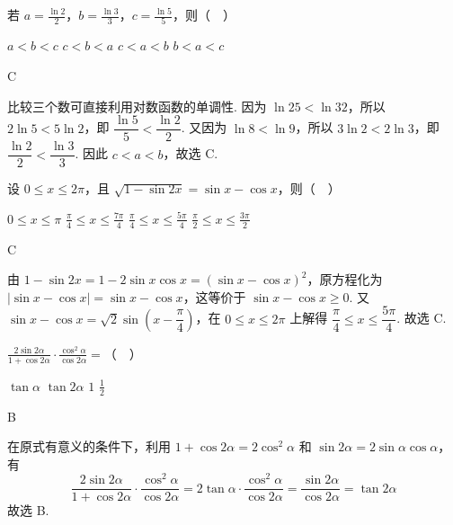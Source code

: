 \begin{problem}
若 \(a = \frac{\ln 2}{2}\)，\(b = \frac{\ln 3}{3}\)，\(c = \frac{\ln 5}{5}\)，则（\(\quad\)）

\choices
    {\(a < b < c\)}
    {\(c < b < a\)}
    {\(c < a < b\)}
    {\(b < a < c\)}
\end{problem}

\begin{answer}
C
\end{answer}

\begin{solution}
比较三个数可直接利用对数函数的单调性. 因为 \(\ln25<\ln32\)，所以 \(2\ln5<5\ln2\)，即 \(\dfrac{\ln5}{5}<\dfrac{\ln2}{2}\). 又因为 \(\ln8<\ln9\)，所以 \(3\ln2<2\ln3\)，即 \(\dfrac{\ln2}{2}<\dfrac{\ln3}{3}\). 因此 \(c<a<b\)，故选 C.
\end{solution}

\begin{problem}
设 \(0 \leqslant x \leqslant 2\pi\)，且 \(\sqrt{1 - \sin 2x} = \sin x - \cos x\)，则（\(\quad\)）

\choices
    {\(0 \leqslant x \leqslant \pi\)}
    {\(\frac{\pi}{4} \leqslant x \leqslant \frac{7\pi}{4}\)}
    {\(\frac{\pi}{4} \leqslant x \leqslant \frac{5\pi}{4}\)}
    {\(\frac{\pi}{2} \leqslant x \leqslant \frac{3\pi}{2}\)}
\end{problem}

\begin{answer}
C
\end{answer}

\begin{solution}
由 \(1-\sin2x=1-2\sin x\cos x=(\sin x-\cos x)^2\)，原方程化为 \(|\sin x-\cos x|=\sin x-\cos x\)，这等价于 \(\sin x-\cos x\geqslant0\). 又 \(\sin x-\cos x=\sqrt{2}\sin\left(x-\dfrac{\pi}{4}\right)\)，在 \(0\leqslant x\leqslant2\pi\) 上解得 \(\dfrac{\pi}{4}\leqslant x\leqslant\dfrac{5\pi}{4}\). 故选 C.
\end{solution}

\begin{problem}
\(\frac{2\sin 2\alpha}{1 + \cos 2\alpha} \cdot \frac{\cos^2\alpha}{\cos 2\alpha} =\)（\(\quad\)）

\choices
    {\(\tan \alpha\)}
    {\(\tan 2\alpha\)}
    {\(1\)}
    {\(\frac{1}{2}\)}
\end{problem}

\begin{answer}
B
\end{answer}

\begin{solution}
在原式有意义的条件下，利用 \(1+\cos2\alpha=2\cos^2\alpha\) 和 \(\sin2\alpha=2\sin\alpha\cos\alpha\)，有
\[
\frac{2\sin2\alpha}{1+\cos2\alpha}\cdot\frac{\cos^2\alpha}{\cos2\alpha}
=2\tan\alpha\cdot\frac{\cos^2\alpha}{\cos2\alpha}
=\frac{\sin2\alpha}{\cos2\alpha}
=\tan2\alpha
\]
故选 B.
\end{solution}

